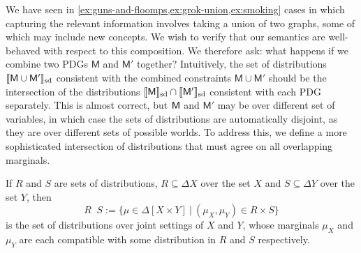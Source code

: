\documentclass{article}
\newcommand{\notation}[2][]{#1}
\renewcommand{\notation}[2][]{{\color{notationcolor} #2}}
\DeclarePairedDelimiter{\SD}{\llbracket}{\rrbracket_{\text{sd}}}
\DeclareMathOperator\dcap{\mathop{\dot\cap}}
\newcommand{\sfM}{\mathsf M}
\numberwithin{equation}{section}
\begin{document}
\begin{vfull}
	We have seen
        in \cref{ex:guns-and-floomps,ex:grok-union,ex:smoking} cases in
        which capturing the relevant information involves taking a
        union of two graphs, some of which may include new
        concepts. We wish to verify that our semantics are
        well-behaved with respect to this composition.	  
	We therefore ask: what happens if we combine two PDGs $\sfM$
        and $\sfM'$ together? Intuitively, the set of distributions
        $\SD{\sfM \cup \sfM'}$ consistent with the combined
        constraints $\sfM\cup \sfM'$ should be the intersection of the
        distributions $\SD{\sfM} \cap \SD{\sfM'}$ consistent
        with each PDG separately. This is almost correct, but $\sf M$
        and $\sfM'$ may be over different set of variables, in which
        case the sets of distributions are automatically disjoint, as
        they are over different sets of possible worlds. To address
        this, we define a more sophisticated intersection of
        distributions that must agree on all overlapping
        marginals. %
	
	\begin{defn}[$\dcap$]\label{def:marginal-dist-intersection}
		If $R$ and $S$ are sets of distributions, $R \subseteq \Delta X$ over the set $X$ and $S\subseteq \Delta Y$ over the set $Y$, then
			{$$R \dcap S := \Big\{ \mu \in  \Delta [X \!\times\! Y] ~\Big|~ (\mu_{X}, \mu_{Y}) \in R \times S \Big\}  $$}%
		is the set of distributions over joint settings of $X$ and $Y$, whose marginals $\mu_X$ and $\mu_Y$ are each compatible with some distribution in $R$ and $S$ respectively. 
		

\end{defn}
\end{vfull}
\end{document}
